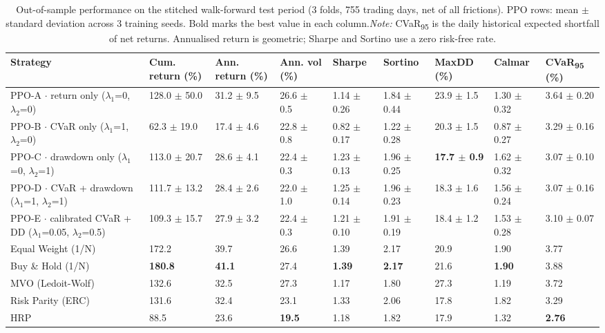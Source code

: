 \documentclass[11pt]{article}
\begin{document}
\begin{table}[!htbp]
\centering\scriptsize
\caption{Out-of-sample performance on the stitched walk-forward test period (3 folds, 755 trading days, net of all frictions). PPO rows: mean $\pm$ standard deviation across 3 training seeds. Bold marks the best value in each column.\label{tab-main-syn} \emph{Note:} CVaR\textsubscript{95} is the daily historical expected shortfall of net returns. Annualised return is geometric; Sharpe and Sortino use a zero risk-free rate.}
\begin{adjustbox}{max width=\linewidth}
\begin{tabular}{@{}lllllllll@{}}
\toprule
Strategy & Cum. return (\%) & Ann. return (\%) & Ann. vol (\%) & Sharpe & Sortino & MaxDD (\%) & Calmar & CVaR\textsubscript{95} (\%) \\
\midrule
PPO-A $\cdot$ return only {($\lambda_1$=0, $\lambda_2$=0)} & 128.0{ $\pm$ 50.0} & 31.2{ $\pm$ 9.5} & 26.6{ $\pm$ 0.5} & 1.14{ $\pm$ 0.26} & 1.84{ $\pm$ 0.44} & 23.9{ $\pm$ 1.5} & 1.30{ $\pm$ 0.32} & 3.64{ $\pm$ 0.20} \\
PPO-B $\cdot$ CVaR only {($\lambda_1$=1, $\lambda_2$=0)} & 62.3{ $\pm$ 19.0} & 17.4{ $\pm$ 4.6} & 22.8{ $\pm$ 0.8} & 0.82{ $\pm$ 0.17} & 1.22{ $\pm$ 0.28} & 20.3{ $\pm$ 1.5} & 0.87{ $\pm$ 0.27} & 3.29{ $\pm$ 0.16} \\
PPO-C $\cdot$ drawdown only {($\lambda_1$=0, $\lambda_2$=1)} & 113.0{ $\pm$ 20.7} & 28.6{ $\pm$ 4.1} & 22.4{ $\pm$ 0.3} & 1.23{ $\pm$ 0.13} & 1.96{ $\pm$ 0.25} & \textbf{17.7{ $\pm$ 0.9}} & 1.62{ $\pm$ 0.32} & 3.07{ $\pm$ 0.10} \\
PPO-D $\cdot$ CVaR + drawdown {($\lambda_1$=1, $\lambda_2$=1)} & 111.7{ $\pm$ 13.2} & 28.4{ $\pm$ 2.6} & 22.0{ $\pm$ 1.0} & 1.25{ $\pm$ 0.14} & 1.96{ $\pm$ 0.23} & 18.3{ $\pm$ 1.6} & 1.56{ $\pm$ 0.24} & 3.07{ $\pm$ 0.16} \\
PPO-E $\cdot$ calibrated CVaR + DD {($\lambda_1$=0.05, $\lambda_2$=0.5)} & 109.3{ $\pm$ 15.7} & 27.9{ $\pm$ 3.2} & 22.4{ $\pm$ 0.3} & 1.21{ $\pm$ 0.10} & 1.91{ $\pm$ 0.19} & 18.4{ $\pm$ 1.2} & 1.53{ $\pm$ 0.28} & 3.10{ $\pm$ 0.07} \\
Equal Weight (1/N) & 172.2 & 39.7 & 26.6 & 1.39 & 2.17 & 20.9 & 1.90 & 3.77 \\
Buy \& Hold (1/N) & \textbf{180.8} & \textbf{41.1} & 27.4 & \textbf{1.39} & \textbf{2.17} & 21.6 & \textbf{1.90} & 3.88 \\
MVO (Ledoit-Wolf) & 132.6 & 32.5 & 27.3 & 1.17 & 1.80 & 27.3 & 1.19 & 3.72 \\
Risk Parity (ERC) & 131.6 & 32.4 & 23.1 & 1.33 & 2.06 & 17.8 & 1.82 & 3.29 \\
HRP & 88.5 & 23.6 & \textbf{19.5} & 1.18 & 1.82 & 17.9 & 1.32 & \textbf{2.76} \\
\bottomrule
\end{tabular}
\end{adjustbox}
\end{table}
\end{document}
